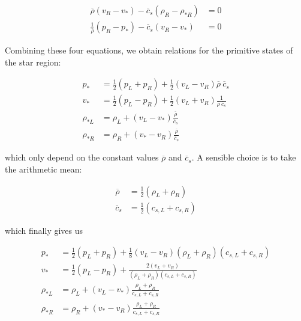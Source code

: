 \begin{align}
    \overline{\rho} (v_R - v_*) - \overline{c}_s (\rho_{R} - \rho_{*R}) &= 0 \label{eq:app-PV3} \\
    \frac{1}{\overline{\rho}} (p_R - p_*) - \overline{c}_s (v_R - v_*) &= 0 \label{eq:app-PV4}
\end{align}

Combining these four equations, we obtain relations for the primitive states of the star region:

\begin{align}
    p_* &= \frac{1}{2}(p_L + p_R) + 
            \frac{1}{2} (v_L - v_R) \overline{\rho} \ \overline{c}_s \\
    v_* &= \frac{1}{2}(p_L - p_R) + 
            \frac{1}{2} (v_L + v_R) \frac{1}{\overline{\rho} \ \overline{c}_s }\\
    \rho_{*L} &= \rho_L + (v_L - v_*) \frac{\overline{\rho}}{ \overline{c}_s }\\
    \rho_{*R} &= \rho_R + (v_* - v_R) \frac{\overline{\rho}}{ \overline{c}_s }
\end{align}

which only depend on the constant values $\overline{\rho}$ and $\overline{c}_s$. A sensible choice 
is to take the arithmetic mean:

\begin{align}
    \overline{\rho} &= \frac{1}{2} (\rho_L + \rho_R) \\
    \overline{c}_s &= \frac{1}{2} (c_{s,L} + c_{s,R})
\end{align}

which finally gives us


\begin{align}
    p_* &= \frac{1}{2}(p_L + p_R) + 
            \frac{1}{8} (v_L - v_R) (\rho_L + \rho_R)(c_{s,L} + c_{s, R}) \\
    v_* &= \frac{1}{2}(p_L - p_R) + 
             \frac{2 (v_L + v_R)}{ (\rho_L + \rho_R)(c_{s,L} + c_{s, R}) }\\
    \rho_{*L} &= \rho_L + (v_L - v_*) \frac{\rho_L + \rho_R}{c_{s,L} + c_{s,R} }\\
    \rho_{*R} &= \rho_R + (v_* - v_R)  \frac{\rho_L + \rho_R}{c_{s,L} + c_{s,R} }
\end{align}


